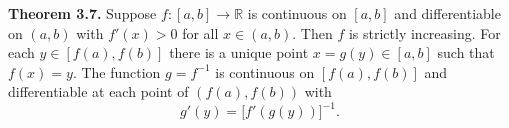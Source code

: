 \textbf{Theorem 3.7.}  Suppose $f: [a, b] \to \mathbb{R}$ is continuous on $[a, b]$ and differentiable on $(a, b)$ with $f'(x) > 0$ for all $x \in (a, b)$. Then $f$ is strictly increasing. For each $y \in [f(a), f(b)]$ there is a unique point $x = g(y) \in [a, b]$ such that $f(x) = y$. The function $g = f^{-1}$ is continuous on $[f(a), f(b)]$ and differentiable at each point of $(f(a), f(b))$ with
$$g'(y) = \bigl[f'(g(y))\bigr]^{-1}.$$
